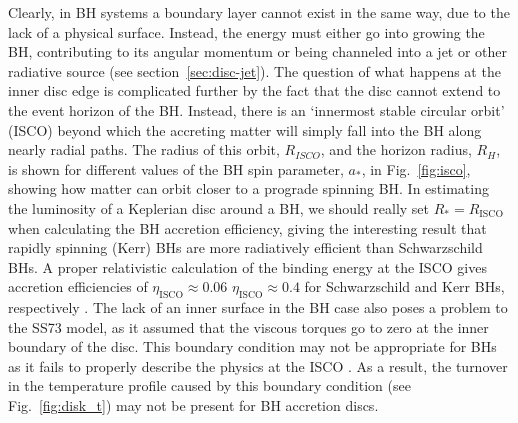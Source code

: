 Clearly, in BH systems a boundary layer cannot exist in the same way,
due to the lack of a physical surface. Instead, the energy must either go into
growing the BH, contributing to its angular momentum or being
channeled into a jet or other radiative source (see section~\ref{sec:disc-jet}).
The question of what happens at the inner disc edge
is complicated further by the fact that the disc cannot extend to the 
event horizon of the BH. Instead, there is an `innermost stable circular orbit' (ISCO)
beyond which the accreting matter will simply fall 
into the BH along nearly radial paths. The radius
of this orbit, $R_{ISCO}$, and the horizon radius, $R_H$,
is shown for different values of the BH spin parameter, $a_*$, 
in Fig.~\ref{fig:isco}, showing how matter can orbit closer to a prograde spinning BH. 
In estimating the luminosity of a Keplerian disc around a BH, 
we should really set $R_*=R_{\mathrm{ISCO}}$ when calculating the BH accretion efficiency,
giving the interesting result that rapidly spinning (Kerr) BHs
are more radiatively efficient than Schwarzschild BHs. A proper relativistic
calculation of the binding energy at the ISCO gives accretion efficiencies of 
$\eta_{\mathrm{ISCO}}\approx0.06$ $\eta_{\mathrm{ISCO}}\approx0.4$ for Schwarzschild
and Kerr BHs, respectively \citep[e.g.][]{thorne1974}. The lack of an inner surface in the
BH case also poses a problem to the SS73 model, as it assumed that the viscous torques
go to zero at the inner boundary of the disc. This boundary condition
may not be appropriate for BHs as it fails to properly describe the physics at the ISCO
\citep[e.g.][]{abramowicz}. As a result, the turnover in the temperature profile
caused by this boundary condition (see Fig.~\ref{fig:disk_t}) 
may not be present for BH accretion discs.

